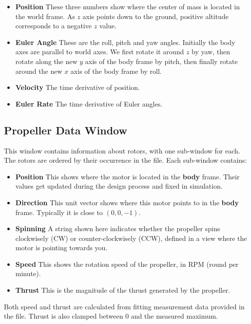\begin{itemize}
  \item \textbf{Position} These three numbers show where the center of mass is located in the world frame. As $z$ axis points down to the ground, positive altitude corresponds to a negative $z$ value.
  
  \item \textbf{Euler Angle} These are the roll, pitch and yaw angles. Initially the body axes are parallel to world axes. We first rotate it around $z$ by yaw, then rotate along the new $y$ axis of the body frame by pitch, then finally rotate around the new $x$ axis of the body frame by roll.

  \item \textbf{Velocity} The time derivative of position.

  \item \textbf{Euler Rate} The time derivative of Euler angles.
\end{itemize}

\subsection{Propeller Data Window}
This window contains information about rotors, with one sub-window for each. The rotors are ordered by their occurrence in the file. Each sub-window contains:

\begin{itemize}
  \item \textbf{Position} This shows where the motor is located in the \textbf{body} frame. Their values get updated during the design process and fixed in simulation.

  \item \textbf{Direction} This unit vector shows where this motor points to in the \textbf{body} frame. Typically it is close to $(0,0,-1)$.

  \item \textbf{Spinning} A string shown here indicates whether the propeller spins clockwisely (CW) or counter-clockwisely (CCW), defined in a view where the motor is pointing towards you.

  \item \textbf{Speed} This shows the rotation speed of the propeller, in RPM (round per minute).

  \item \textbf{Thrust} This is the magnitude of the thrust generated by the propeller.
\end{itemize}
Both speed and thrust are calculated from fitting measurement data provided in the file. Thrust is also clamped between $0$ and the measured maximum.

